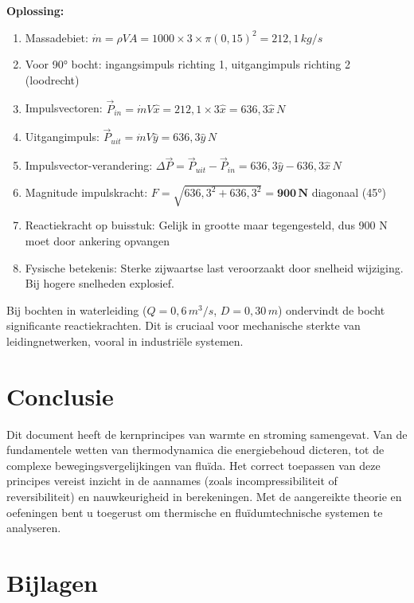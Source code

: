 \documentclass[a4paper,11pt,twoside]{report}
\begin{document}
\textbf{Oplossing:}
\begin{enumerate}
    \item Massadebiet: $\dot{m} = \rho V A = 1000 \times 3 \times \pi (0{,}15)^2 = 212{,}1 \, kg/s$
    \item Voor 90° bocht: ingangsimpuls richting 1, uitgangimpuls richting 2 (loodrecht)
    \item Impulsvectoren: $\vec{P}_{in} = \dot{m} V \hat{x} = 212{,}1 \times 3 \hat{x} = 636{,}3 \hat{x} \, N$
    \item Uitgangimpuls: $\vec{P}_{uit} = \dot{m} V \hat{y} = 636{,}3 \hat{y} \, N$
    \item Impulsvector-verandering: $\Delta \vec{P} = \vec{P}_{uit} - \vec{P}_{in} = 636{,}3 \hat{y} - 636{,}3 \hat{x} \, N$
    \item Magnitude impulskracht: $F = \sqrt{636{,}3^2 + 636{,}3^2} = \mathbf{900 \, N}$ diagonaal (45°)
    \item Reactiekracht op buisstuk: Gelijk in grootte maar tegengesteld, dus 900 N moet door ankering opvangen
    \item Fysische betekenis: Sterke zijwaartse last veroorzaakt door snelheid wijziging. Bij hogere snelheden explosief.
\end{enumerate}


Bij bochten in waterleiding ($Q = 0{,}6 \, m^3/s$, $D = 0{,}30 \, m$) ondervindt de bocht significante reactiekrachten. Dit is cruciaal voor mechanische sterkte van leidingnetwerken, vooral in industriële systemen.

\chapter*{Conclusie}
Dit document heeft de kernprincipes van warmte en stroming samengevat. Van de fundamentele wetten van thermodynamica die energiebehoud dicteren, tot de complexe bewegingsvergelijkingen van fluïda. Het correct toepassen van deze principes vereist inzicht in de aannames (zoals incompressibiliteit of reversibiliteit) en nauwkeurigheid in berekeningen. Met de aangereikte theorie en oefeningen bent u toegerust om thermische en fluïdumtechnische systemen te analyseren.

\chapter{Bijlagen}
\end{document}
